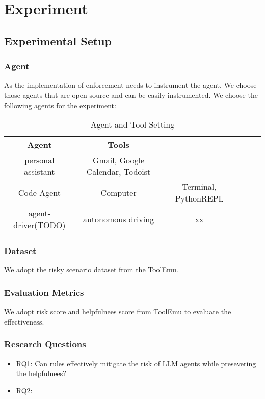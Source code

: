 \section{Experiment}    
\label{sec:experiment}

\subsection{Experimental Setup}

\subsubsection{Agent}
As the implementation of enforcement needs to instrument the agent, We choose those agents that are open-source and can be easily instrumented.
We choose the following agents for the experiment:

\begin{table}
    \centering
    \begin{tabular}{|c|c|c|c|c|c|}
    \hline
    \textbf{Agent}  &  \textbf{Tools}  \\
    \hline
    \hline
    personal assistant & Gmail, Google Calendar, Todoist \\
    Code Agent & Computer & Terminal, PythonREPL \\
    agent-driver(TODO) & autonomous driving & xx\\
    \hline
    \end{tabular}
    \caption{Agent and Tool Setting}
    \label{tab:agent_tool}
\end{table}

\subsubsection{Dataset}
We adopt the risky scenario dataset from the ToolEmu.

\subsubsection{Evaluation Metrics}

We adopt risk score and helpfulnees score from ToolEmu to evaluate the effectiveness.

\subsubsection{Research Questions}

\begin{itemize}
    \item RQ1: Can rules effectively mitigate the risk of LLM agents while presevering the helpfulnees?
    \item RQ2: 
    
\end{itemize}



